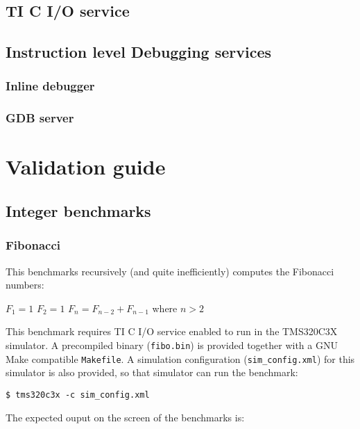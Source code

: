 \subsection{TI C I/O service}

\subsection{Instruction level Debugging services}

\subsubsection{Inline debugger}

\subsubsection{GDB server}

\section{Validation guide}

\subsection{Integer benchmarks}

\subsubsection{Fibonacci}

This benchmarks recursively (and quite inefficiently) computes the Fibonacci numbers:

\indent $F_1=1$
\newline
\indent $F_2=1$
\newline
\indent $F_n = F_{n - 2} + F_{n - 1}$ where $n > 2$
\newline

This benchmark requires TI C I/O service enabled to run in the TMS320C3X simulator.
A precompiled binary (\texttt{fibo.bin}) is provided together with a GNU Make compatible \texttt{Makefile}.
A simulation configuration (\texttt{sim\_config.xml}) for this simulator is also provided, so that simulator can run the benchmark:

\begin{verbatim}
$ tms320c3x -c sim_config.xml
\end{verbatim}

\noindent The expected ouput on the screen of the benchmarks is:

